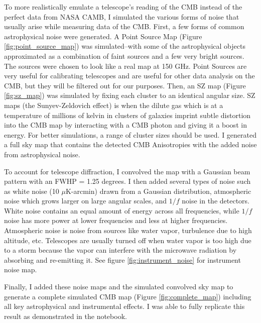 \documentclass[12pt]{article}
\begin{document}
To more realistically emulate a telescope’s reading of the CMB instead of the perfect data from NASA CAMB, I simulated the various forms of noise that usually arise while measuring data of the CMB. First, a few forms of common astrophysical noise were generated. A Point Source Map (Figure \ref{fig:point_source_map}) was simulated–with some of the astrophysical objects approximated as a combination of faint sources and a few very bright sources. The sources were chosen to look like a real map at 150 GHz. Point Sources are very useful for calibrating telescopes and are useful for other data analysis on the CMB, but they will be filtered out for our purposes. Then, an SZ map (Figure \ref{fig:sz_map}) was simulated by fixing each cluster to an identical angular size. SZ maps (the Sunyev-Zeldovich effect) is when the dilute gas which is at a temperature of millions of kelvin in clusters of galaxies imprint subtle distortion into the CMB map by interacting with a CMB photon and giving it a boost in energy. For better simulations, a range of cluster sizes should be used. I generated a full sky map that contains the detected CMB Anisotropies with the added noise from astrophysical noise.

To account for telescope diffraction, I convolved the map with a Gaussian beam pattern with an FWHP = 1.25 degrees. I then added several types of noise such as white noise (10 $\mu$K-arcmin) drawn from a Gaussian distribution, atmospheric noise which grows larger on large angular scales, and $1/f$ noise in the detectors. White noise contains an equal amount of energy across all frequencies, while $1/f$ noise has more power at lower frequencies and less at higher frequencies. Atmospheric noise is noise from sources like water vapor, turbulence due to high altitude, etc. Telescopes are usually turned off when water vapor is too high due to a storm because the vapor can interfere with the microwave radiation by absorbing and re-emitting it. See figure \ref{fig:instrument_noise} for instrument noise map.

Finally, I added these noise maps and the simulated convolved sky map to generate a complete simulated CMB map (Figure \ref{fig:complete_map}) including all key astrophysical and instrumental effects. I was able to fully replicate this result as demonstrated in the notebook.
\end{document}
